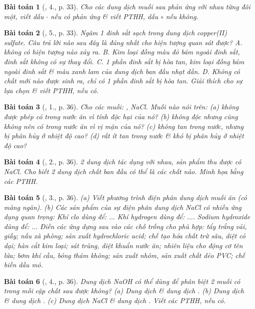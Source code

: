 \documentclass{article}
\newtheorem{baitoan}{Bài toán}
\begin{document}
\begin{baitoan}[\cite{SGK_Hoa_Hoc_9}, 4., p. 33]
	Cho các dung dịch muối sau phản ứng với nhau từng đôi một, viết dấu $\cdot$ nếu có phản ứng \& viết PTHH, dấu $\circ$ nếu không.
\end{baitoan}

\begin{baitoan}[\cite{SGK_Hoa_Hoc_9}, 5., p. 33]
	Ngâm 1 đinh sắt sạch trong dung dịch copper(II) sulfate. Câu trả lời nào sau đây là đúng nhất cho hiện tượng quan sát được? {\sf A.} không có hiện tượng nào xảy ra. {\sf B.} Kim loại đồng màu đỏ bám ngoài đinh sắt, đinh sắt không có sự thay đổi. {\sf C.} 1 phần đinh sắt bị hòa tan, kim loại đồng bám ngoài đinh sắt \& màu xanh lam của dung dịch ban đầu nhạt dần. {\sf D.} Không có chất mới nào được sinh ra, chỉ có 1 phần đinh sắt bị hòa tan. Giải thích cho sự lựa chọn \& viết PTHH, nếu có.
\end{baitoan}

\begin{baitoan}[\cite{SGK_Hoa_Hoc_9}, 1., p. 36]
	Cho các muối: \emph{, NaCl}. Muối nào nói trên: (a) không được phép có trong nước ăn vì tính độc hại của nó? (b) không độc nhưng cũng không nên có trong nước ăn vì vị mặn của nó? (c) không tan trong nước, nhưng bị phân hủy ở nhiệt độ cao? (d) rất ít tan trong nước \& khó bị phân hủy ở nhiệt độ cao?
\end{baitoan}

\begin{baitoan}[\cite{SGK_Hoa_Hoc_9}, 2., p. 36]
	2 dung dịch tác dụng với nhau, sản phẩm thu được có \emph{NaCl}. Cho biết 2 dung dịch chất ban đầu có thể là các chất nào. Minh họa bằng các PTHH.
\end{baitoan}

\begin{baitoan}[\cite{SGK_Hoa_Hoc_9}, 3., p. 36]
	(a) Viết phương trình điện phân dung dịch muối ăn (có màng ngăn). (b) Các sản phẩm của sự điện phân dung dịch \emph{NaCl} có nhiều ứng dụng quan trọng: Khí clo dùng để: $\ldots$ Khí hydrogen dùng để: $\ldots$. Sodium hydroxide dùng để: $\ldots$ Điền các ứng dựng sau vào các chỗ trống cho phù hợp: tẩy trắng vải, giấy; nấu xà phòng; sản xuất hydrochloric acid; chế tạo hóa chất trừ sâu, diệt cỏ dại; hàn cắt kim loại; sát trùng, diệt khuẩn nước ăn; nhiên liệu cho động cơ tên lửa; bơm khí cầu, bóng thám không; sản xuất nhôm, sản xuất chất dẻo PVC; chế biến dầu mỏ.
\end{baitoan}

\begin{baitoan}[\cite{SGK_Hoa_Hoc_9}, 4., p. 36]
	Dung dịch \emph{NaOH} có thể dùng để phân biệt 2 muối có trong mỗi cặp chất sau được không? (a) Dung dịch \emph{} \& dung dịch \emph{}. (b) Dung dịch \emph{} \& dung dịch \emph{}. (c) Dung dịch \emph{NaCl} \& dung dịch \emph{}. Viết các PTHH, nếu có.
\end{baitoan}
\end{document}
